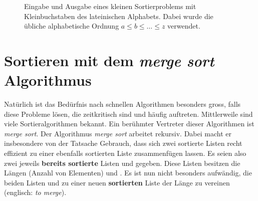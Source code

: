 \begin{figure}[H]
	\def\lvld{1.2}                  %
	\pgfmathsetmacro\shft{-6*\lvld} %
	\centering
	\caption{Eingabe und Ausgabe eines kleinen Sortierproblems mit Kleinbuchstaben des lateinischen Alphabets. Dabei wurde die übliche alphabetische Ordnung $a\leq b\leq \ldots \leq z$ verwendet.}
	\label{fig:bsp2}
\end{figure}

\section{Sortieren mit dem \textit{merge sort} Algorithmus}
Natürlich ist das Bedürfnis nach schnellen Algorithmen besonders gross, falls diese Probleme lösen, die zeitkritisch sind und häufig auftreten. Mittlerweile sind viele Sortieralgorithmen bekannt. Ein berühmter Vertreter dieser Algorithmen ist \textit{merge sort}. Der Algorithmus \textit{merge sort} arbeitet rekursiv. Dabei macht er insbesondere von der Tatsache Gebrauch, dass sich zwei sortierte Listen recht effizient zu einer ebenfalls sortierten Liste zusammenfügen lassen. Es seien also zwei jeweils \textbf{bereits sortierte} Listen  und  gegeben. Diese Listen besitzen die Längen (Anzahl von Elementen)  und . Es ist nun nicht besonders aufwändig, die beiden Listen  und  zu einer neuen \textbf{sortierten} Liste  der Länge  zu vereinen (englisch: \textit{to merge}).

